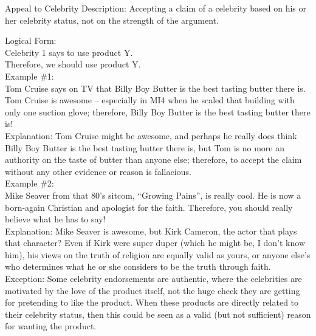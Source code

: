 \documentclass[a4paper,12pt,single,pdftex]{scrartcl}
\begin{document}
Appeal to Celebrity
    Description: Accepting a claim of a celebrity based on his or her celebrity status, not on the strength of the argument.

    
      Logical Form:
    \\

    
      Celebrity 1 says to use product Y.
    \\

    
      Therefore, we should use product Y.
    \\

    
      Example \#1:
    \\

    
      Tom Cruise says on TV that Billy Boy Butter is the best tasting butter there is.  Tom Cruise is awesome -- especially in MI4 when he scaled that building with only one suction glove; therefore, Billy Boy Butter is the best tasting butter there is!
    \\

    
      Explanation: Tom Cruise might be awesome, and perhaps he really does think Billy Boy Butter is the best tasting butter there is, but Tom is no more an authority on the taste of butter than anyone else; therefore, to accept the claim without any other evidence or reason is fallacious.
    \\

    
      Example \#2:
    \\

    
      Mike Seaver from that 80’s sitcom, “Growing Pains”, is really cool.  He is now a born-again Christian and apologist for the faith.  Therefore, you should really believe what he has to say!
    \\

    
      Explanation: Mike Seaver is awesome, but Kirk Cameron, the actor that plays that character?  Even if Kirk were super duper (which he might be, I don’t know him), his views on the truth of religion are equally valid as yours, or anyone else's who determines what he or she considers to be the truth through faith.
    \\

    
      Exception: Some celebrity endorsements are authentic, where the celebrities are motivated by the love of the product itself, not the huge check they are getting for pretending to like the product.  When these products are directly related to their celebrity status, then this could be seen as a valid (but not sufficient) reason for wanting the product.
    \\
\end{document}
